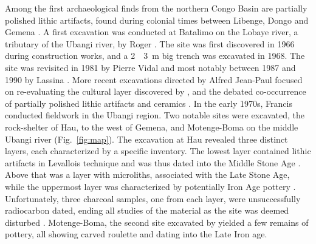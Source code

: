 \documentclass[smallextended,natbib]{svjour3}       %
\begin{document}
Among the first archaeological finds from the northern Congo Basin are partially polished lithic artifacts, found during colonial times between Libenge, Dongo and Gemena \citep{Bequaert.1937,Bequaert.1938a,Bequaert.1940a,Bequaert.1946}. A first excavation was conducted at Batalimo on the Lobaye river, a tributary of the Ubangi river, by Roger \citet{DeBayleDesHermens.1969,DeBayleDesHermens.1971,deBayledesHermens.1975}. The site was first discovered in 1966 during construction works, and a 2~\texttimes~3~m big trench was excavated in 1968. The site was revisited in 1981 by Pierre Vidal and most notably between 1987 and 1990 by Lassina \citet{Kote.1992}. More recent excavations directed by Alfred Jean-Paul \citet{Ndanga.2010} focused on re-evaluating the cultural layer discovered by \citet{deBayledesHermens.1975}, and the debated co-occurrence of partially polished lithic artifacts and ceramics \citep[137]{Eggert.1987c}. In the early 1970s, Francis \citet{vanNoten.1978} conducted fieldwork in the Ubangi region. Two notable sites were excavated, the rock-shelter of Hau, to the west of Gemena, and Motenge-Boma on the middle Ubangi river (Fig.~\ref{fig:map}). The excavation at Hau revealed three distinct layers, each characterized by a specific inventory. The lowest layer contained lithic artifacts in Levallois technique and was thus dated into the Middle Stone Age \citep[27,30]{vanNoten.1982d}. Above that was a layer with microliths, associated with the Late Stone Age, while the uppermost layer was characterized by potentially Iron Age pottery \citep[31]{Bahuchet.1992}. Unfortunately, three charcoal samples, one from each layer, were unsuccessfully radiocarbon dated, ending all studies of the material as the site was deemed disturbed \citep[27,30]{vanNoten.1982d}. Motenge-Boma, the second site excavated by \citet{vanNoten.1978} yielded a few remains of pottery, all showing carved roulette \citep[Fig.~40]{vanNoten.1982} and dating into the Late Iron age.
\end{document}
